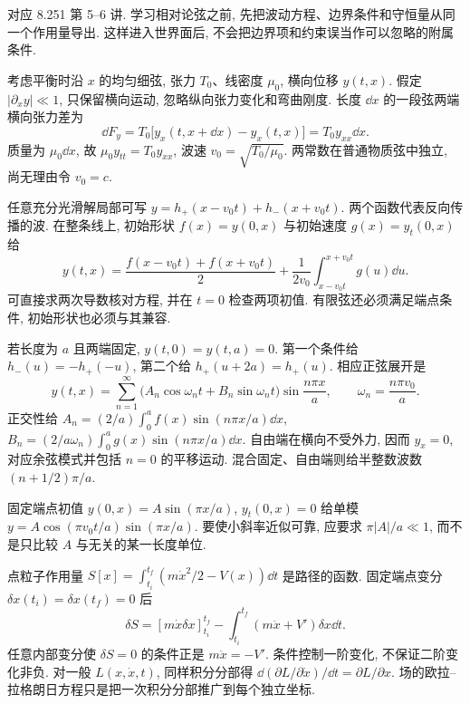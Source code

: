 \label{ch:basic-variation}
对应 8.251 第 5--6 讲. 学习相对论弦之前, 先把波动方程、边界条件和守恒量从同一个作用量导出. 这样进入世界面后, 不会把边界项和约束误当作可以忽略的附属条件.

考虑平衡时沿 $x$ 的均匀细弦, 张力 $T_0$、线密度 $\mu_0$, 横向位移 $y(t,x)$. 假定 $|\partial_xy|\ll1$, 只保留横向运动, 忽略纵向张力变化和弯曲刚度. 长度 $\dd x$ 的一段弦两端横向张力差为
\[
 \dd F_y=T_0\big[y_x(t,x+\dd x)-y_x(t,x)\big]
 =T_0y_{xx}\dd x.
\]
质量为 $\mu_0\dd x$, 故 $\mu_0y_{tt}=T_0y_{xx}$, 波速 $v_0=\sqrt{T_0/\mu_0}$. 两常数在普通物质弦中独立, 尚无理由令 $v_0=c$.

任意充分光滑解局部可写 $y=h_+(x-v_0t)+h_-(x+v_0t)$. 两个函数代表反向传播的波. 在整条线上, 初始形状 $f(x)=y(0,x)$ 与初始速度 $g(x)=y_t(0,x)$ 给
\[
 y(t,x)=\frac{f(x-v_0t)+f(x+v_0t)}2
 +\frac1{2v_0}\int_{x-v_0t}^{x+v_0t}g(u)\dd u.
\]
可直接求两次导数核对方程, 并在 $t=0$ 检查两项初值. 有限弦还必须满足端点条件, 初始形状也必须与其兼容.

若长度为 $a$ 且两端固定, $y(t,0)=y(t,a)=0$. 第一个条件给 $h_-(u)=-h_+(-u)$, 第二个给 $h_+(u+2a)=h_+(u)$. 相应正弦展开是
\[
 y(t,x)=\sum_{n=1}^\infty
 \big(A_n\cos\omega_nt+B_n\sin\omega_nt\big)
 \sin\frac{n\pi x}{a},\qquad\omega_n=\frac{n\pi v_0}{a}.
\]
正交性给 $A_n=(2/a)\int_0^af(x)\sin(n\pi x/a)\dd x$,
$B_n=(2/a\omega_n)\int_0^ag(x)\sin(n\pi x/a)\dd x$. 自由端在横向不受外力, 因而 $y_x=0$, 对应余弦模式并包括 $n=0$ 的平移运动. 混合固定、自由端则给半整数波数 $(n+1/2)\pi/a$.

\begin{example}
固定端点初值 $y(0,x)=A\sin(\pi x/a)$, $y_t(0,x)=0$ 给单模 $y=A\cos(\pi v_0t/a)\sin(\pi x/a)$. 要使小斜率近似可靠, 应要求 $\pi|A|/a\ll1$, 而不是只比较 $A$ 与无关的某一长度单位.
\end{example}

点粒子作用量 $S[x]=\int_{t_i}^{t_f}(m\dot x^2/2-V(x))\dd t$ 是路径的函数. 固定端点变分 $\delta x(t_i)=\delta x(t_f)=0$ 后
\[
 \delta S=[m\dot x\delta x]_{t_i}^{t_f}
 -\int_{t_i}^{t_f}(m\ddot x+V')\delta x\dd t.
\]
任意内部变分使 $\delta S=0$ 的条件正是 $m\ddot x=-V'$. 条件控制一阶变化, 不保证二阶变化非负. 对一般 $L(x,\dot x,t)$, 同样积分分部得 $\dd(\partial L/\partial\dot x)/\dd t=\partial L/\partial x$. 场的欧拉--拉格朗日方程只是把一次积分分部推广到每个独立坐标.

